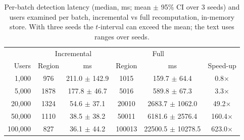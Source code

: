 \begin{table}[t]
\centering
\caption{Per-batch detection latency (median, ms; mean $\pm$ 95\% CI over 3 seeds)
and users examined per batch, incremental vs full recomputation, in-memory store. With three seeds
the $t$-interval can exceed the mean; the text uses ranges over seeds.}
\label{tab:scale}
\begin{tabular}{rccccc}
\toprule
& \multicolumn{2}{c}{Incremental} & \multicolumn{2}{c}{Full} & \\
Users & Region & ms & Region & ms & Speed-up \\
\midrule
1,000 & 976 & 211.0 $\pm$ 142.9 & 1015 & 159.7 $\pm$ 64.4 & 0.8$\times$ \\
5,000 & 1878 & 177.8 $\pm$ 46.7 & 5016 & 589.8 $\pm$ 67.3 & 3.3$\times$ \\
20,000 & 1324 & 54.6 $\pm$ 37.1 & 20010 & 2683.7 $\pm$ 1062.0 & 49.2$\times$ \\
50,000 & 1110 & 38.5 $\pm$ 38.2 & 50011 & 6181.6 $\pm$ 2576.4 & 160.4$\times$ \\
100,000 & 827 & 36.1 $\pm$ 44.2 & 100013 & 22500.5 $\pm$ 10278.5 & 623.0$\times$ \\
\bottomrule
\end{tabular}
\end{table}
